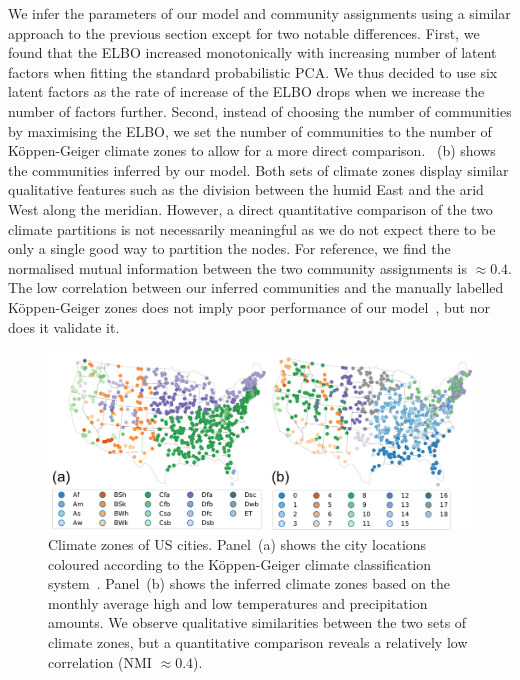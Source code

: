 \documentclass[onecolumn,pre,superscriptaddress, longbibliography, nofootinbib, notitlepage]{revtex4-1}
\begin{document}
We infer the parameters of our model and community assignments using a similar approach to the previous section except for two notable differences. First, we found that the ELBO increased monotonically with increasing number of latent factors when fitting the standard probabilistic PCA.\@ 
We thus decided to use six latent factors as the rate of increase of the ELBO drops when we increase the number of factors further. Second, instead of choosing the number of communities by maximising the ELBO, we set the number of communities to the number of K\"oppen-Geiger climate zones to allow for a more direct comparison. ~(b) shows the communities inferred by our model. Both sets of climate zones display similar qualitative features such as the division between the humid East and the arid West along the  meridian. 
However, a direct quantitative comparison of the two climate partitions is not necessarily meaningful as we do not expect there to be only a single good way to partition the nodes. For reference, we find the normalised mutual information between the two community assignments is $\approx 0.4$. 
The low correlation between our inferred communities and the manually labelled K\"oppen-Geiger zones does not imply poor performance of our model~\cite{Peel2017}, but nor does it validate it.

\begin{figure}
    \includegraphics[width=\linewidth]{map_inferred_koppen.pdf}
    \caption{\label{fig:climate_maps}Climate zones of US cities. Panel~(a) shows the city locations coloured according to the K\"oppen-Geiger climate classification system~\cite{kottek2006world}. Panel~(b) shows the inferred climate zones based on the monthly average high and low temperatures and precipitation amounts. We observe qualitative similarities between the two sets of climate zones, but a quantitative comparison reveals a relatively low correlation (NMI $\approx 0.4$). 
    }
\end{figure}
\end{document}
